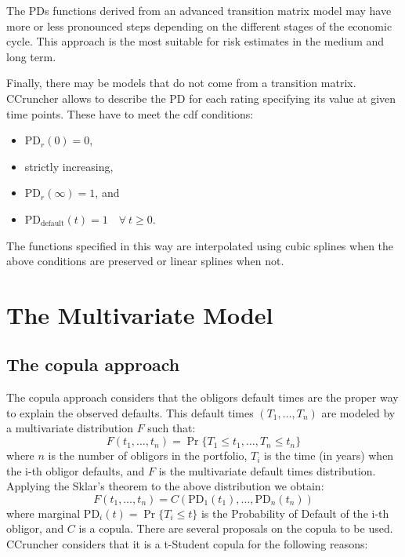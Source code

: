 \documentclass[11pt,fleqn]{book} %
\begin{document}
The PDs functions derived from an advanced transition matrix model may 
have more or less pronounced steps depending on the different stages of 
the economic cycle. This approach is the most suitable for risk estimates 
in the medium and long term.

Finally, there may be models that do not come from a transition matrix.
CCruncher allows to describe the PD for each rating specifying its value
at given time points. These have to meet the cdf conditions:
\begin{itemize}
	\item $\text{PD}_r(0) = 0$,
	\item strictly increasing, 
	\item $\text{PD}_r(\infty) = 1$, and
	\item $\text{PD}_{\text{default}}(t) = 1 \quad \forall\ t \ge 0$.
\end{itemize}
The functions specified in this way are interpolated using cubic splines
when the above conditions are preserved or linear splines when not.

\section{The Multivariate Model}

\subsection{The copula approach}
The copula approach considers that the obligors default times are the 
proper way to explain the observed defaults. This default times 
$(T_1, \dots, T_n)$ are modeled by a multivariate distribution $F$ 
such that:
\begin{displaymath}
	F(t_1, \dots, t_n) = \Pr \{T_1 \le t_1, \dots, T_n \le t_n\}
\end{displaymath}
where $n$ is the number of obligors in the portfolio, $T_i$ is the time 
(in years) when the i-th obligor defaults, and $F$ is the multivariate
default times distribution. Applying the Sklar's theorem to the above 
distribution we obtain:
\begin{displaymath}
	F(t_1, \dots, t_n) = 
	C\left(\text{PD}_1(t_1), \dots, \text{PD}_n(t_n)\right)
\end{displaymath}
where marginal $\text{PD}_i(t) = \Pr\{T_i \le t\}$ is the Probability 
of Default of the i-th obligor, and $C$ is a copula. There are several 
proposals on the copula to be used. CCruncher considers that it is a 
t-Student copula for the following reasons:
\end{document}
